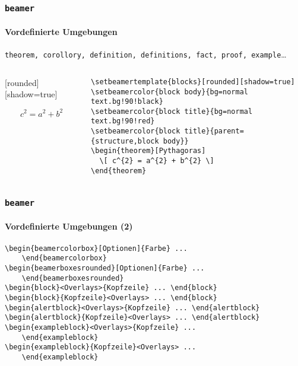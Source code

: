 \begin{frame}[fragile]
  \frametitle{\texttt{beamer}}
  \framesubtitle{Vordefinierte Umgebungen}
  \texttt{theorem, corollory, definition, definitions, fact, proof,
    example}\dots
  \begin{columns}[T]
    \begin{column}{.35\textwidth}
      [rounded][shadow=true]
      \begin{theorem}[Pythagoras]
        \[ c^{2} = a^{2} + b^{2} \]
      \end{theorem}
    \end{column}
    \begin{column}{.6\textwidth}
\begin{lstlisting}[language={[LaTeX]TeX}]
\setbeamertemplate{blocks}[rounded][shadow=true]
\setbeamercolor{block body}{bg=normal text.bg!90!black}
\setbeamercolor{block title}{bg=normal text.bg!90!red}
\setbeamercolor{block title}{parent={structure,block body}}
\begin{theorem}[Pythagoras]
  \[ c^{2} = a^{2} + b^{2} \]
\end{theorem}
\end{lstlisting}
    \end{column}
  \end{columns}
\end{frame}

\begin{frame}[fragile]
  \frametitle{\texttt{beamer}}
  \framesubtitle{Vordefinierte Umgebungen (2)}
\begin{lstlisting}[language={[LaTeX]TeX}]
\begin{beamercolorbox}[Optionen]{Farbe} ...
    \end{beamercolorbox}
\begin{beamerboxesrounded}[Optionen]{Farbe} ...
    \end{beamerboxesrounded}
\begin{block}<Overlays>{Kopfzeile} ... \end{block}
\begin{block}{Kopfzeile}<Overlays> ... \end{block}
\begin{alertblock}<Overlays>{Kopfzeile} ... \end{alertblock}
\begin{alertblock}{Kopfzeile}<Overlays> ... \end{alertblock}
\begin{exampleblock}<Overlays>{Kopfzeile} ...
    \end{exampleblock}
\begin{exampleblock}{Kopfzeile}<Overlays> ...
    \end{exampleblock}
\end{lstlisting}
\end{frame}

